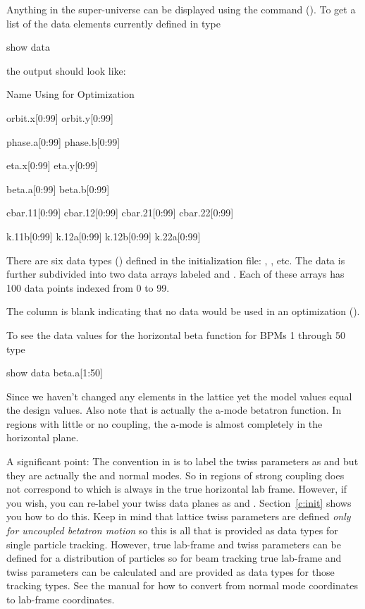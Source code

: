 Anything in the super-universe can be displayed using the 
command (). To get a list of the data elements currently
defined in \tao type
\begin{example}
  show data
\end{example}
the output should look like:
\begin{example}
  Name                                   Using for Optimization

  orbit.x[0:99]
  orbit.y[0:99]

  phase.a[0:99]
  phase.b[0:99]

  eta.x[0:99]
  eta.y[0:99]

  beta.a[0:99]
  beta.b[0:99]

  cbar.11[0:99]
  cbar.12[0:99]
  cbar.21[0:99]
  cbar.22[0:99]

  k.11b[0:99]
  k.12a[0:99]
  k.12b[0:99]
  k.22a[0:99]
\end{example}
There are six  data types () defined in the
initialization file: , , etc.  The  data is further
subdivided into two  data arrays labeled  and .
Each of these arrays has 100 data points indexed from 0 to 99.

The  column is blank indicating that no data
would be used in an optimization ().

To see the data values for the horizontal beta function for \cesr BPMs
1 through 50 type
\begin{example}
  show data beta.a[1:50]
\end{example}
Since we haven't changed any elements in the lattice yet the model
values equal the design values. Also note that  is actually
the a-mode betatron function. In regions with little or no coupling,
the a-mode is almost completely in the horizontal plane.

A significant point: The convention in \bmad is to label the twiss
parameters as  and  but they are actually the  and
 normal modes. So in regions of strong coupling  does
not correspond to  which is always in the true horizontal
lab frame.  However, if you wish, you can re-label your twiss data
planes as  and .  Section~\ref{c:init} shows you how to do
this. Keep in mind that lattice twiss parameters are defined
\textit{only for uncoupled betatron motion} so this is all that is
provided as data types for single particle tracking.  However, true
lab-frame  and  twiss parameters can be defined for a
distribution of particles so for beam
tracking true lab-frame  and  twiss parameters can be
calculated and are provided as data types for those tracking
types. See the \bmad manual for how to convert from normal mode
coordinates to lab-frame coordinates.

